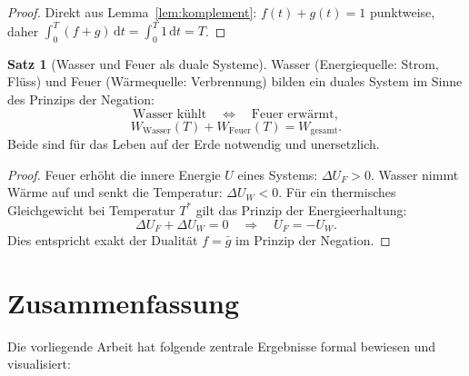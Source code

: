 ﻿\documentclass[a4paper,12pt]{article}
\theoremstyle{definition}
\newtheorem{satz}{Satz}
\begin{document}
\begin{proof}
    Direkt aus Lemma~\ref{lem:komplement}: $f(t) + g(t) = 1$ punktweise, daher
    $\int_0^T (f+g)\,\mathrm{d}t = \int_0^T 1\,\mathrm{d}t = T$. \qedhere
\end{proof}

\begin{satz}[Wasser und Feuer als duale Systeme]
\label{satz:dual}
    Wasser (Energiequelle: Strom, Fl\"uss) und Feuer (W\"armequelle: Verbrennung)
    bilden ein duales System im Sinne des Prinzips der Negation:
    \[
        \text{Wasser k\"uhlt} \quad \Longleftrightarrow \quad \text{Feuer erw\"armt},
    \]
    \[
        W_{\mathrm{Wasser}}(T) + W_{\mathrm{Feuer}}(T) = W_{\mathrm{gesamt}}.
    \]
    Beide sind f\"ur das Leben auf der Erde notwendig und unersetzlich.
\end{satz}

\begin{proof}
    Feuer erh\"oht die innere Energie $U$ eines Systems: $\Delta U_F > 0$.
    Wasser nimmt W\"arme auf und senkt die Temperatur: $\Delta U_W < 0$.
    F\"ur ein thermisches Gleichgewicht bei Temperatur $T^*$ gilt das
    Prinzip der Energieerhaltung:
    \[
        \Delta U_F + \Delta U_W = 0 \quad \Rightarrow \quad U_F = -U_W.
    \]
    Dies entspricht exakt der Dualit\"at $f = \bar{g}$ im Prinzip der Negation. \qedhere
\end{proof}

\section{Zusammenfassung}

Die vorliegende Arbeit hat folgende zentrale Ergebnisse formal bewiesen und
visualisiert:
\end{document}
